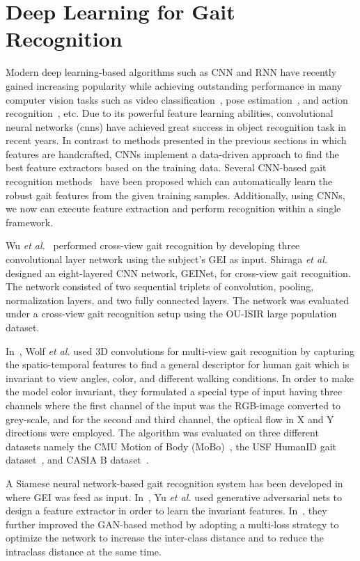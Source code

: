 \section{Deep Learning for Gait Recognition} \label{sec:deep_learning_gait_rec}
Modern deep learning-based algorithms such as CNN and RNN have recently gained increasing popularity while achieving outstanding performance in many computer vision tasks such as video classification~\cite{karpathy_14}, pose estimation~\cite{Cao_19}, and action recognition~\cite{Song_17, Du_15}, etc. Due to its powerful feature learning abilities, convolutional neural networks (\gls{cnn}s) have achieved great success in object recognition task in recent years. In contrast to methods presented in the previous sections in which features are handcrafted, CNNs implement a data-driven approach to find the best feature extractors based on the training data. Several CNN-based gait recognition methods~\cite{Wu_17, Shiraga_16, Wolf_16, Zhang_16, Yu_17, Yu_19} have been proposed which can automatically learn the robust gait features from the given training samples. Additionally, using CNNs, we now can execute feature extraction and perform recognition within a single framework. 

Wu \textit{et al.}~\cite{Wu_17} performed cross-view gait recognition by developing three convolutional layer network using the subject's GEI as input. Shiraga \textit{et al.}~\cite{Shiraga_16} designed an eight-layered CNN network, GEINet, for cross-view gait recognition. The network consisted of two sequential triplets of convolution, pooling, normalization layers, and two fully connected layers. The network was evaluated under a cross-view gait recognition setup using the OU-ISIR large population dataset.


In~\cite{Wolf_16}, Wolf \textit{et al.} used 3D convolutions for multi-view gait recognition by capturing the spatio-temporal features to find a general descriptor for human gait which is invariant to view angles, color, and different walking conditions. In order to make the model color invariant, they formulated a special type of input having three channels where the first channel of the input was the RGB-image converted to grey-scale, and for the second and third channel, the optical flow in X and Y directions were employed. The algorithm was evaluated on three different datasets namely the CMU Motion of Body (MoBo)~\cite{Gross_01}, the USF HumanID gait dataset~\cite{Sarkar_05}, and CASIA B dataset~\cite{Yu_06}.

A Siamese neural network-based gait recognition system has been developed in~\cite{Zhang_16} where GEI was feed as input. In~\cite{Yu_17}, Yu \textit{et al.} used generative adversarial nets to design a feature extractor in order to learn the invariant features. In~\cite{Yu_19}, they further improved the GAN-based method by adopting a multi-loss strategy to optimize the network to increase the inter-class distance and to reduce the intraclass distance at the same time.


